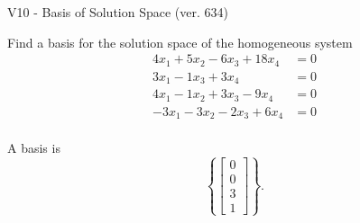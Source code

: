 \begin{exercise}
  \begin{exerciseTitle}V10 - Basis of Solution Space (ver. 634)\end{exerciseTitle}
  \begin{exerciseStatement}
    Find a basis for the solution space of the homogeneous system 
\begin{align*}
 4 x_ 1 + 5 x_ 2 -6 x_ 3 + 18 x_ 4 &= 0  \\ 
  3 x_ 1 -1 x_ 3 + 3 x_ 4 &= 0  \\ 
  4 x_ 1 -1 x_ 2 + 3 x_ 3 -9 x_ 4 &= 0  \\ 
  -3 x_ 1 -3 x_ 2 -2 x_ 3 + 6 x_ 4 &= 0  \\ 
 \end{align*}


 
  \end{exerciseStatement}

  \begin{exerciseAnswer}
   A basis is   
\[\left\{\left[\begin{array}{c}
0 \\
0 \\
3 \\
1
\end{array}\right]\right\}.\]

  


  \end{exerciseAnswer}
\end{exercise}